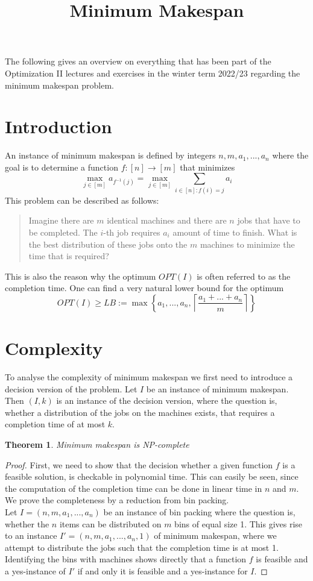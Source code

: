 \documentclass[a4paper, 12pt]{article}
\newtheorem{theorem}{Theorem}[section]
\begin{document}
	\begin{titlepage} 
		\title{Minimum Makespan}
		\clearpage\maketitle
		\thispagestyle{empty}
	\end{titlepage}
	The following gives an overview on everything that has been part of the Optimization II lectures and exercises in the winter term 2022/23 regarding the minimum makespan problem. 
	\section{Introduction}
	An instance of minimum makespan is defined by integers $n,m,a_1,...,a_n$ where the goal is to determine a function $f:[n] \to [m]$ that minimizes \[\max_{j \in [m]} a_{f^{-1}(j)} = \max_{j \in [m]} \sum_{i \in [n]: f(i) = j} a_i\]
	This problem can be described as follows: \begin{quote}
		Imagine there are $m$ identical machines and there are $n$ jobs that have to be completed. The $i$-th job requires $a_i$ amount of time to finish. What is the best distribution of these jobs onto the $m$ machines to minimize the time that is required?
	\end{quote}
	This is also the reason why the optimum $OPT(I)$ is often referred to as the completion time. One can find a very natural lower bound for the optimum \[OPT(I) \geq LB := \max\left\{a_1,...,a_n,\left\lceil\frac{a_1+...+a_n}{m}\right\rceil\right\}\]
	\section{Complexity}
	To analyse the complexity of minimum makespan we first need to introduce a decision version of the problem. Let $I$ be an instance of minimum makespan. Then $(I,k)$ is an instance of the decision version, where the question is, whether a distribution of the jobs on the machines exists, that requires a completion time of at most $k$.
	\begin{theorem}
		Minimum makespan is NP-complete
	\end{theorem}
	\begin{proof}
		First, we need to show that the decision whether a given function $f$ is a feasible solution, is checkable in polynomial time. This can easily be seen, since the computation of the completion time can be done in linear time in $n$ and $m$.\\
		We prove the completeness by a reduction from bin packing.\\
		Let $I = (n,m,a_1,...,a_n)$ be an instance of bin packing where the question is, whether the $n$ items can be distributed on $m$ bins of equal size 1. This gives rise to an instance $I' = (n,m,a_1,...,a_n,1)$ of minimum makespan, where we attempt to distribute the jobs such that the completion time is at most 1.\\
		Identifying the bins with machines shows directly that a function $f$ is feasible and a yes-instance of $I'$ if and only it is feasible and a yes-instance for $I$.
	\end{proof}
\end{document}
